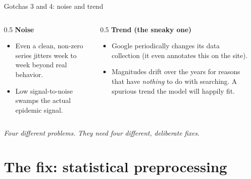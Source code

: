 \documentclass[aspectratio=169,11pt]{beamer}
\begin{document}
\begin{frame}{Gotchas 3 and 4: noise and trend}
  \begin{columns}[T]
    \begin{column}{0.5\textwidth}
      \textbf{Noise}
      \begin{itemize}
        \item Even a clean, non-zero series jitters week to week beyond real behavior.
        \item Low signal-to-noise swamps the actual epidemic signal.
      \end{itemize}
    \end{column}
    \begin{column}{0.5\textwidth}
      \textbf{Trend (the sneaky one)}
      \begin{itemize}
        \item Google periodically changes its data collection (it even annotates this on
              the site).
        \item Magnitudes drift over the years for reasons that have \emph{nothing} to do
              with searching. A spurious trend the model will happily fit.
      \end{itemize}
    \end{column}
  \end{columns}
  \vfill
  \begin{center}
    \itshape Four different problems. They need four different, deliberate fixes.
  \end{center}
\end{frame}

\section{The fix: statistical preprocessing}
\end{document}
